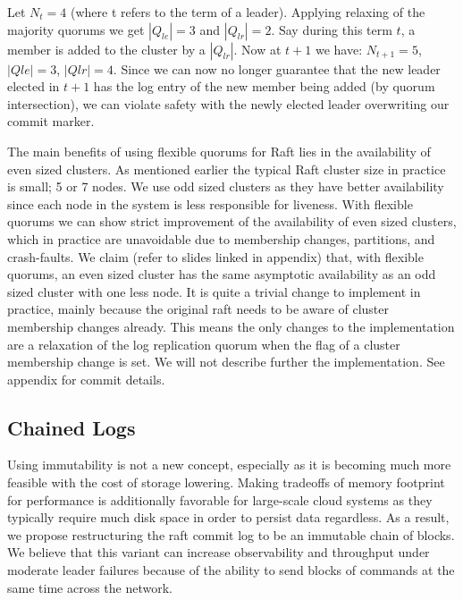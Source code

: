 Let $N_t= 4$ (where t refers to the term of a leader). 
Applying relaxing of the majority quorums we get $|Q_{le}| = 3$ and $|Q_{lr}| = 2$. Say during this term $t$, a member is added to the cluster by a $|Q_{lr}|$. 
Now at $t+1$ we have: $N_{t+1} = 5$, $|Qle| = 3$, $|Qlr| = 4$. 
Since we can now no longer guarantee that the new leader elected in $t+1$ has the log entry of the new member being added (by quorum intersection), we can violate safety with the newly elected leader overwriting our commit marker. 

The main benefits of using flexible quorums for Raft lies in the availability of even sized clusters. 
As mentioned earlier the typical Raft cluster size in practice is small;  5 or 7 nodes. 
We use odd sized clusters as they have better availability since each node in the system is less responsible for liveness. 
With flexible quorums we can show strict improvement of the availability of even sized clusters, which in practice are unavoidable due to membership changes, partitions, and crash-faults. 
We claim (refer to slides linked in appendix) that, with flexible quorums, an even sized cluster has the same asymptotic availability as an odd sized cluster with one less node. 
It is quite a trivial change to implement in practice, mainly because the original raft needs to be aware of cluster membership changes already. 
This means the only changes to the implementation are a relaxation of the log replication quorum when the flag of a cluster membership change is set. 
We will not describe further the implementation. See appendix for commit details. 

\subsection{Chained Logs}
Using immutability is not a new concept, especially as it is becoming much more feasible with the cost of storage lowering. 
Making tradeoffs of memory footprint for performance is additionally favorable for large-scale cloud systems as they typically require much disk space in order to persist data regardless. 
As a result, we propose restructuring the raft commit log to be an immutable chain of blocks. 
We believe that this variant can increase observability and throughput under moderate leader failures because of the ability to send blocks of commands at the same time across the network. 

